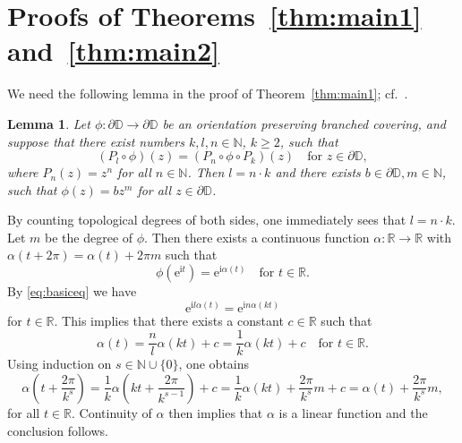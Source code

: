 \documentclass[12pt]{amsart}
\makeatletter
\newtheorem{lem}[thm]{Lemma}
\newtheorem*{ex}{Example}
\newtheorem*{pf}{Proof}
\newcommand{\R}{\mathbb{R}}
\newcommand{\D}{\mathbb{D}}
\newcommand{\N}{\mathbb{N}}
\newcommand{\ra}{\rightarrow}
\newcommand{\co}{\colon}
\renewenvironment{pf}[1][\proofname]{%
  \par
  \pushQED{\qed}%
  \normalfont\topsep6\p@ \@plus6\p@ \trivlist
  \item[\hskip\labelsep\itshape
        \bfseries #1\@addpunct{:}]%
  \ignorespaces
}{%
  \popQED\endtrivlist
}
\renewenvironment{ex}[1][\examplename]{%
  \par
  \pushQED{\qed}%
  \normalfont\topsep6\p@ \@plus6\p@ \trivlist
  \item[\hskip\labelsep\itshape
        \bfseries #1\@addpunct{:}]%
  \ignorespaces
}{%
  \popQED\endtrivlist
}
\renewenvironment{ex}{%
  \normalfont\topsep6\p@ \@plus6\p@ \trivlist
  \item[\hskip\labelsep\bfseries Example:]%
  \ignorespaces
}{%
  \endtrivlist
}
\makeatother
\begin{document}


\section{Proofs of Theorems~\ref{thm:main1} and~\ref{thm:main2}}\label{sec:main}
\noindent
We need the following lemma in the proof of Theorem~\ref{thm:main1}; cf.~\cite[Lemma~7.1]{BLM}.
\begin{lem} \label{lem:Rot} Let $\phi\co\partial \D \ra \partial \D$ be an orientation preserving branched covering, and suppose that there   exist numbers $k,l,n\in \N$, $k\ge 2$, such that 
\begin{equation} \label{eq:basiceq}
(P_l\circ \phi)(z)= (P_n\circ \phi\circ P_k)(z) \quad \text{for $z\in \partial \D$},
\end{equation}
where $P_n(z)=z^n$ for all $n\in\N$.
Then $l=n\cdot k$  and there exists  $b\in \partial \D, m\in \N$,  such that $\phi(z)=bz^m$ for all $z\in \partial \D$.
\end{lem}
\begin{pf} By counting topological degrees of both sides, one immediately sees that 
$l=n\cdot k$. 
Let $m$ be the degree of $\phi$. Then there exists a continuous function $\alpha\co \R \ra \R$ with $\alpha(t+2\pi)=\alpha(t)+2\pi m$ such that
$$ \phi(\mathrm{e}^{ \mathrm{i} t}) = \mathrm{e}^{ \mathrm{i}\alpha(t)} \quad \text{for  $t\in \R$}. $$
By  \eqref{eq:basiceq} we have 
$$ \mathrm{e}^{ \mathrm{i} l \alpha(t)} = \mathrm{e}^{ \mathrm{i} n\alpha(kt)}$$
for $t\in \R$. This implies that there exists a constant $c\in \R$ such that 
$$ \alpha(t)=\frac{n}{l}\alpha(kt)+c=\frac 1k \alpha(kt)+c  \quad \text{for  $t\in \R$}. $$
Using induction on $s\in\N\cup\{0\}$, one obtains
$$ \alpha\left(t+\frac{2\pi}{k^s}\right)=\frac 1k \alpha\left(kt+\frac{2\pi}{k^{s-1}}\right)+c=\frac 1k \alpha(kt)+\frac{2\pi}{k^s}m+c=\alpha(t)+\frac{2\pi}{k^s}m,$$  for all $t\in\R$.
Continuity of $\alpha$ then implies that $\alpha$ is a linear function and the conclusion follows.
\end{pf}
\end{document}
